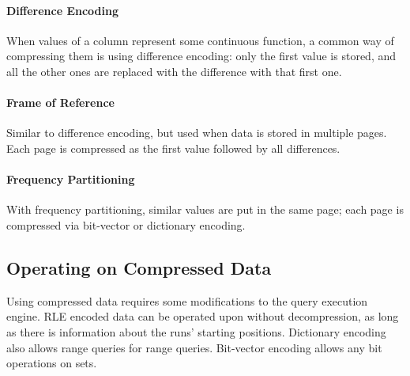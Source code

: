 \paragraph{Difference Encoding}
When values of a column represent some continuous function, a common way of compressing them is using difference encoding: only the first value is stored, and all the other ones are replaced with the difference with that first one.

\paragraph{Frame of Reference}
Similar to difference encoding, but used when data is stored in multiple pages. Each page is compressed as the first value followed by all differences.

\paragraph{Frequency Partitioning}
With frequency partitioning, similar values are put in the same page; each page is compressed via bit-vector or dictionary encoding.

\subsection{Operating on Compressed Data}

Using compressed data requires some modifications to the query execution engine. RLE encoded data can be operated upon without decompression, as long as there is information about the runs' starting positions. Dictionary encoding also allows range queries for range queries. Bit-vector encoding allows any bit operations on sets.

